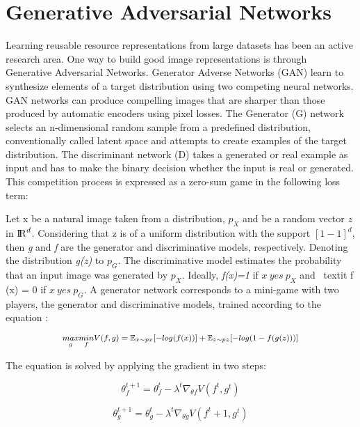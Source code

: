 \section{Generative Adversarial Networks}

Learning reusable resource representations from large datasets has been an active research area. One way to build good image representations is through Generative Adversarial Networks. Generator Adverse Networks (GAN) learn to synthesize elements of a target distribution using two competing neural networks. GAN networks can produce compelling images that are sharper than those produced by automatic encoders using pixel losses. The Generator (G) network selects an n-dimensional random sample from a predefined distribution, conventionally called latent space and attempts to create examples of the target distribution. The discriminant network (D) takes a generated or real example as input and has to make the binary decision whether the input is real or generated. This competition process is expressed as a zero-sum game in the following loss term:

Let x be a natural image taken from a distribution, $ p_X$ and be a random vector \textit{z} in $ {\rm I\!R}^d $. Considering that z is of a uniform distribution with the support $[1-1]^d$, then \textit{g} and \textit{f} are the generator and discriminative models, respectively. Denoting the distribution \textit{g(z)} to $ p_G $. The discriminative model estimates the probability that an input image was generated by $ p_X $. Ideally, \textit{f(x)=1}  if $ x \ yes \ p_X $ and \ textit {f (x) = 0} if $ x \ yes \ p_G $. A generator network corresponds to a mini-game with two players, the generator and discriminative models, trained according to the equation \cite{Liu2016}:


\begin{equation}
\medmath{ \underset{g}{max} \underset{f}{min} V(f,g)= \mathbb{E}_{x \sim px} [-log(f(x))]+\mathbb{E}_{z \sim pz}[-log(1-f(g(z)))]} 
\end{equation}


The equation is solved by applying the gradient in two steps:

\begin{equation}
\theta^{t+1}_{f} = \theta^{t}_{f} -\lambda^t \nabla_{\theta f} V (f^t, g^t)
\end{equation}

\begin{equation}
\theta^{t+1}_{g} = \theta^{t}_{g} -\lambda^t \nabla_{\theta g} V (f^t+1, g^t)
\end{equation}